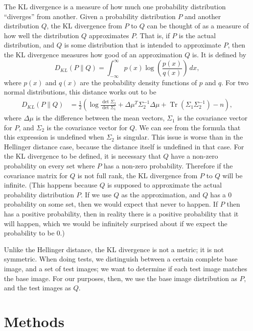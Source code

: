\documentclass{article}
\newcommand*{\Pn}[1]{\left( #1 \right)}
\DeclareMathOperator{\Tr}{Tr}
\begin{document}
The KL divergence is a measure of how much one probability distribution
``diverges'' from another.\cite{wikikl} Given a probability distribution $P$
and another distribution $Q$, the KL divergence from $P$ to $Q$ can be thought
of as a measure of how well the distribution $Q$ approximates $P$. That is, if
$P$ is the actual distribution, and $Q$ is some distribution that is intended
to approximate $P$, then the KL divergence measures how good of an
approximation $Q$ is. It is defined by
\[
    D_{KL}(P\| Q)=\int_{-\infty}^\infty p(x)\log\Pn{\frac{p(x)}{q(x)}}\,dx,
\]
where $p(x)$ and $q(x)$ are the probability density functions of $p$ and $q$.
For two normal distributions, this distance works out to be
\begin{align*}
    D_{KL}(P\| Q)
    &=\frac12\Pn{\log\frac{\det\Sigma_2}{\det\Sigma_1}+\Delta\mu^T\Sigma_2^{-1}\Delta\mu+\Tr(\Sigma_1\Sigma_2^{-1})-n},
\end{align*}
where $\Delta\mu$ is the difference between the mean vectors, $\Sigma_1$ is the
covariance vector for $P$, and $\Sigma_2$ is the covariance vector for $Q$. We
can see from the formula that this expression is undefined when $\Sigma_2$ is
singular. This issue is worse than in the Hellinger distance case, because the
distance itself is undefined in that case. For the KL divergence to be defined,
it is necessary that $Q$ have a non-zero probability on every set where $P$ has
a non-zero probability. Therefore if the covariance matrix for $Q$ is not full
rank, the KL divergence from $P$ to $Q$ will be infinite. (This happens because
$Q$ is supposed to approximate the actual probability distribution $P$. If we
use $Q$ as the approximation, and $Q$ has a $0$ probability on some set, then
we would expect that never to happen. If $P$ then has a positive probability,
then in reality there is a positive probability that it will happen, which we
would be infinitely surprised about if we expect the probability to be $0$.)

Unlike the Hellinger distance, the KL divergence is not a metric; it is not
symmetric. When doing tests, we distinguish between a certain complete base
image, and a set of test images; we want to determine if each test image
matches the base image. For our purposes, then, we use the base image
distribution as $P$, and the test images as $Q$.

\section{Methods}
\end{document}
